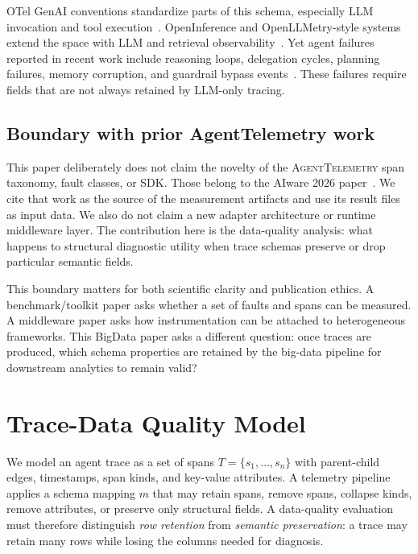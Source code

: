 \documentclass[conference]{IEEEtran}
\begin{document}
OTel GenAI conventions standardize parts of this schema, especially LLM
invocation and tool execution~\cite{otel_genai}. OpenInference and
OpenLLMetry-style systems extend the space with LLM and retrieval
observability~\cite{openllmetry,openinference}. Yet agent failures
reported in recent work include reasoning loops, delegation cycles,
planning failures, memory corruption, and guardrail bypass
events~\cite{mast,agentops,agdebugger}. These failures require fields
that are not always retained by LLM-only tracing.

\subsection{Boundary with prior AgentTelemetry work}

This paper deliberately does not claim the novelty of the
\textsc{AgentTelemetry} span taxonomy, fault classes, or SDK. Those
belong to the AIware 2026 paper~\cite{agenttelemetry_aiware}. We cite
that work as the source of the measurement artifacts and use its result
files as input data. We also do not claim a new adapter architecture or
runtime middleware layer. The contribution here is the data-quality
analysis: what happens to structural diagnostic utility when trace
schemas preserve or drop particular semantic fields.

This boundary matters for both scientific clarity and publication
ethics. A benchmark/toolkit paper asks whether a set of faults and spans
can be measured. A middleware paper asks how instrumentation can be
attached to heterogeneous frameworks. This BigData paper asks a
different question: once traces are produced, which schema properties
are retained by the big-data pipeline for downstream analytics to remain
valid?

\section{Trace-Data Quality Model}
\label{sec:model}

We model an agent trace as a set of spans $T=\{s_1,\ldots,s_n\}$ with
parent-child edges, timestamps, span kinds, and key-value attributes. A
telemetry pipeline applies a schema mapping $m$ that may retain spans,
remove spans, collapse kinds, remove attributes, or preserve only
structural fields. A data-quality evaluation must therefore distinguish
\emph{row retention} from \emph{semantic preservation}: a trace may
retain many rows while losing the columns needed for diagnosis.
\end{document}
